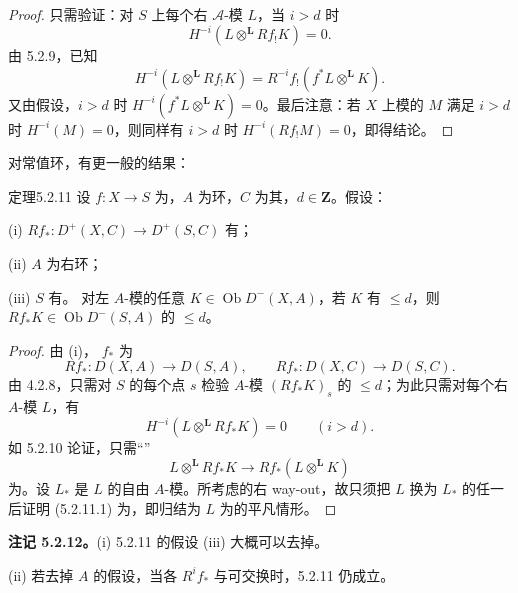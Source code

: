 \begin{proof}
只需验证：对 $S$ 上每个右 $\mathscr A$-模 $L$，当 $i>d$ 时
\[H^{-i}(L\otimes^{\mathbf L}Rf_!K)=0.\]
由 5.2.9，已知
\[H^{-i}(L\otimes^{\mathbf L}Rf_!K)=R^{-i}f_!(f^*L\otimes^{\mathbf L}K).\]
又由假设，$i>d$ 时 $H^{-i}(f^*L\otimes^{\mathbf L}K)=0$。最后注意：若 $X$ 上模的 $M$ 满足 $i>d$ 时 $H^{-i}(M)=0$，则同样有 $i>d$ 时 $H^{-i}(Rf_!M)=0$，即得结论。
\end{proof}
对常值环，有更一般的结果：
\begin{SGAresult}{定理}{5.2.11}
设 $f:X\to S$ 为，$A$ 为环，$C$ 为其，$d\in\mathbf Z$。假设：

(i)  $Rf_*:D^+(X,C)\to D^+(S,C)$ 有；

(ii) $A$ 为右环；

(iii) $S$ 有。
对左 $A$-模的任意 $K\in\operatorname{Ob}D^-(X,A)$，若 $K$ 有 $\le d$，则 $Rf_*K\in\operatorname{Ob}D^-(S,A)$ 的 $\le d$。
\end{SGAresult}
\begin{proof}
由 (i)， $f_*$ 为
\[Rf_*:D(X,A)\longrightarrow D(S,A),\qquad Rf_*:D(X,C)\longrightarrow D(S,C).\]
由 4.2.8，只需对 $S$ 的每个点 $s$ 检验 $A$-模 $(Rf_*K)_s$ 的 $\le d$；为此只需对每个右 $A$-模 $L$，有
\[H^{-i}(L\otimes^{\mathbf L}Rf_*K)=0\qquad(i>d).\]
如 5.2.10 论证，只需“”
\[L\otimes^{\mathbf L}Rf_*K\longrightarrow Rf_*(L\otimes^{\mathbf L}K)\tag{5.2.11.1}\]
为。设 $L_*$ 是 $L$ 的自由 $A$-模。所考虑的右 way-out，故只须把 $L$ 换为 $L_*$ 的任一后证明 (5.2.11.1) 为，即归结为 $L$ 为的平凡情形。
\end{proof}
\textbf{注记 5.2.12。}(i) 5.2.11 的假设 (iii) 大概可以去掉。

(ii) 若去掉 $A$ 的假设，当各 $R^if_*$ 与可交换时，5.2.11 仍成立。

